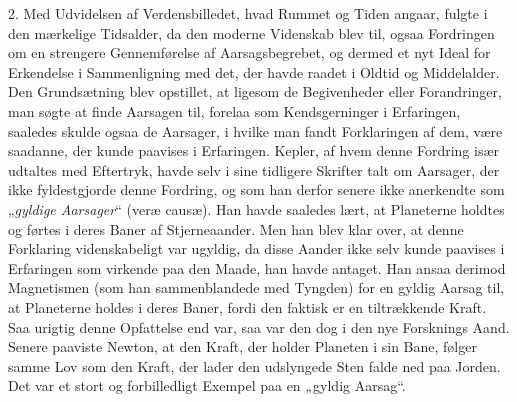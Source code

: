 \documentclass[12pt,a4paper]{article}
\newcommand{\opage}[1]{\marginnote{\footnotesize\textit{[#1]}}}
\begin{document}
\medskip

2. Med Udvidelsen af Verdensbilledet, hvad Rummet og Tiden angaar, fulgte i
den mærkelige Tidsalder, da den moderne Videnskab blev til, ogsaa Fordringen
om en strengere Gennemførelse af Aarsagsbegrebet, og dermed et nyt Ideal for
Erkendelse i Sammenligning med det, der havde raadet i Oldtid og
Middelalder. Den Grundsætning blev opstillet, at ligesom de Begivenheder
eller Forandringer, man søgte at finde Aarsagen til, forelaa som
Kendsgerninger i Erfaringen, saaledes skulde ogsaa de Aarsager, i hvilke man
fandt Forklaringen af dem, være saadanne, der kunde paavises i Erfaringen.
Kepler, af hvem denne Fordring især udtaltes med Eftertryk, havde selv i
sine tidligere Skrifter talt om Aarsager, der ikke fyldestgjorde denne
Fordring, og som han derfor senere ikke anerkendte som „\emph{gyldige
Aarsager}“ (veræ causæ). Han havde saaledes lært, at Planeterne holdtes og
førtes i deres Baner af Stjerneaander. Men han blev klar over, at denne
Forklaring videnskabeligt var ugyldig, da disse Aander ikke selv kunde
paavises i Erfaringen som virkende paa den Maade, han havde antaget. Han
ansaa derimod Magnetismen (som han sammenblandede med Tyngden) for en gyldig
Aarsag til, at Planeterne holdes i deres Baner, fordi den faktisk er en
tiltrækkende Kraft. Saa urigtig denne Opfattelse end var, saa var den dog i
den nye Forsknings \opage{18} Aand. Senere paaviste Newton, at den Kraft, der holder
Planeten i sin Bane, følger samme Lov som den Kraft, der lader den
udslyngede Sten falde ned paa Jorden. Det var et stort og forbilledligt
Exempel paa en „gyldig Aarsag“.
\end{document}
